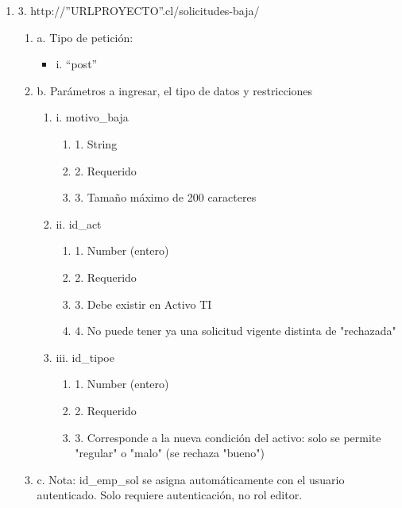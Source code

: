\begin{enumerate}
    \item 3. http://”URLPROYECTO”.cl/solicitudes-baja/
    \begin{enumerate}
        \item a. Tipo de petición:
            \begin{itemize}
               \item i. “post”
            \end{itemize}
        \item b. Parámetros a ingresar, el tipo de datos y restricciones
            \begin{enumerate}
                \item i. motivo\_baja
                    \begin{enumerate}
                        \item 1. String
                        \item 2. Requerido
                        \item 3. Tamaño máximo de 200 caracteres
                    \end{enumerate}
                \item ii. id\_act
                    \begin{enumerate}
                        \item 1. Number (entero)
                        \item 2. Requerido
                        \item 3. Debe existir en Activo TI
                        \item 4. No puede tener ya una solicitud vigente distinta de "rechazada"
                    \end{enumerate}
                \item iii. id\_tipoe
                    \begin{enumerate}
                        \item 1. Number (entero)
                        \item 2. Requerido
                        \item 3. Corresponde a la nueva condición del activo: solo se permite "regular" o "malo" (se rechaza "bueno")
                    \end{enumerate}
            \end{enumerate}
        \item c. Nota: id\_emp\_sol se asigna automáticamente con el usuario autenticado. Solo requiere autenticación, no rol editor.
    \end{enumerate}


\end{enumerate}
